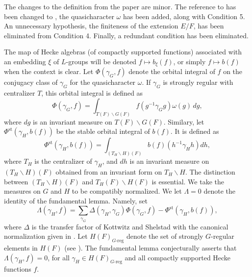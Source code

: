 The changes to the definition from the paper \cite{H2}
are minor.  The reference to \cite{LS1} has been changed
to \cite{KS1}, the quasicharacter $\omega$ has been added,
along with Condition 5.  
An unnecessary hypothesis,
 the finiteness of the extension $E/F$, has been
eliminated from Condition 4.
Finally, a redundant condition 
\cite{H2,6-Condition 4} has been eliminated.

The map of Hecke algebras (of compactly supported functions) 
associated with an embedding $\xi$
of $L$-groups will be denoted $f\mapsto b_\xi(f)$, or simply
$f\mapsto b(f)$ when the context is clear.
Let $\Phi(\gamma_G,f)$ denote the orbital integral of $f$
on the conjugacy class of $\gamma_G$ for the
quasicharacter $\omega$.  If $\gamma_G$ is strongly regular
with centralizer $T$, this orbital integral is defined
as 
$$\Phi(\gamma_G,f) = \int_{T(F)\backslash G(F)}
   f(g^{-1}\gamma_G g)\omega(g)\,dg,$$
where $dg$ is an invariant measure on $T(F)\backslash G(F)$.
Similary, let $\Phi^{\text{st}}(\gamma_H,b(f))$ be
the stable orbital integral of $b(f)$. It is 
defined as
$$\Phi^{\text{st}}(\gamma_H,b(f)) =
\int_{(T_H\backslash H)(F)} b(f)(h^{-1}\gamma_H h) dh,$$
where $T_H$ is the centralizer of $\gamma_H$, and
$dh$ is an invariant measure on $(T_H\backslash H)(F)$
obtained from an invariant form on $T_H\backslash H$.
The distinction between $(T_H\backslash H)(F)$ and
$T_H(F)\backslash H(F)$ is essential.
We take the measures on $G$ and $H$ to be compatibly normalized.
We let $\Lambda=0$
denote the identity of the fundamental lemma.  Namely, set
$$\Lambda(\gamma_H,f) = \sum_{\gamma_G}\Delta(\gamma_H,\gamma_G)\Phi(\gamma_G,f)
 - \Phi^{\text{st}}(\gamma_H,b(f)),$$
 where $\Delta$ is the transfer factor of Kottwitz and Shelstad with
 the canonical normalization given in \cite{H2,7}.  
 Let $H(F)_{G\text{-reg}}$ denote the set of strongly $G$-regular
 elements in $H(F)$ (see \cite{LS1}).  The fundamental
 lemma conjecturally asserts that $\Lambda(\gamma_H,f) = 0$,
 for all $\gamma_H\in H(F)_{G\text{-reg}}$ and all compactly supported
 Hecke functions $f$.  

